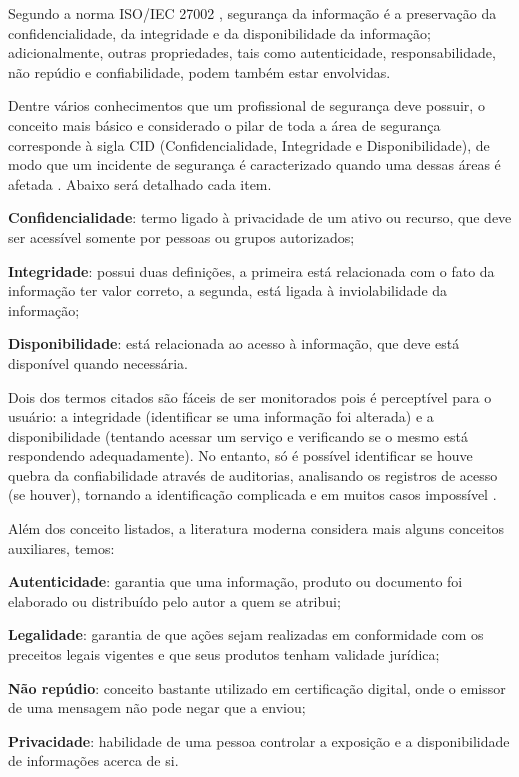 Segundo a norma ISO/IEC 27002 \cite{isoiec27002}, segurança da informação é a preservação da confidencialidade, da integridade e da disponibilidade da informação; adicionalmente, outras propriedades, tais como autenticidade, responsabilidade, não repúdio e confiabilidade, podem também estar envolvidas.

Dentre vários conhecimentos que um profissional de segurança deve possuir, o conceito mais básico e considerado o pilar de toda a área de segurança corresponde à sigla CID (Confidencialidade, Integridade e Disponibilidade), de modo que um incidente de segurança é caracterizado quando uma dessas áreas é afetada \cite{seg-redes-sistemas}. Abaixo será detalhado cada item.

\begin{alineas}
 \item \textbf{Confidencialidade}: termo ligado à privacidade de um ativo ou recurso, que deve ser acessível somente por pessoas ou grupos autorizados;
 \item \textbf{Integridade}: possui duas definições, a primeira está relacionada com o fato da informação ter valor correto, a segunda, está ligada à inviolabilidade da informação;
 \item \textbf{Disponibilidade}: está relacionada ao acesso à informação, que deve está disponível quando necessária.
\end{alineas}

Dois dos termos citados são fáceis de ser monitorados pois é perceptível para o usuário: a integridade (identificar se uma informação foi alterada) e a disponibilidade (tentando acessar um serviço e verificando se o mesmo está respondendo adequadamente). No entanto, só é possível identificar se houve quebra da confiabilidade através de auditorias, analisando os registros de acesso (se houver), tornando a identificação complicada e em muitos casos impossível \cite{seg-redes-sistemas}.

Além dos conceito listados, a literatura moderna considera mais alguns conceitos auxiliares, temos:

\begin{alineas}
 \item \textbf{Autenticidade}: garantia que uma informação, produto ou documento foi elaborado ou distribuído pelo autor a quem se atribui;
 \item \textbf{Legalidade}: garantia de que ações sejam realizadas em conformidade com os preceitos legais vigentes e que seus produtos tenham validade jurídica;
 \item \textbf{Não repúdio}: conceito bastante utilizado em certificação digital, onde o emissor de uma mensagem não pode negar que a enviou;
 \item \textbf{Privacidade}: habilidade de uma pessoa controlar a exposição e a disponibilidade de informações acerca de si.
\end{alineas}

